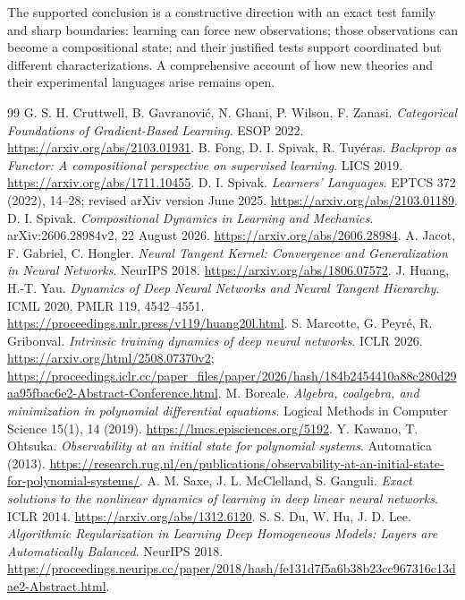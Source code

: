 \documentclass[11pt]{article}
\theoremstyle{definition}\newtheorem{definition}[theorem]{Definition}
\theoremstyle{remark}\newtheorem{remark}[theorem]{Remark}
\begin{document}
The supported conclusion is a constructive direction with an exact test
family and sharp boundaries: learning can force new observations; those
observations can become a compositional state; and their justified tests
support coordinated but different characterizations. A comprehensive account
of how new theories and their experimental languages arise remains open.

\begin{thebibliography}{99}
 G. S. H. Cruttwell, B. Gavranovi\'c, N. Ghani, P. Wilson, F. Zanasi. \emph{Categorical Foundations of Gradient-Based Learning}. ESOP 2022. \url{https://arxiv.org/abs/2103.01931}.
 B. Fong, D. I. Spivak, R. Tuy\'eras. \emph{Backprop as Functor: A compositional perspective on supervised learning}. LICS 2019. \url{https://arxiv.org/abs/1711.10455}.
 D. I. Spivak. \emph{Learners' Languages}. EPTCS 372 (2022), 14--28; revised arXiv version June 2025. \url{https://arxiv.org/abs/2103.01189}.
 D. I. Spivak. \emph{Compositional Dynamics in Learning and Mechanics}. arXiv:2606.28984v2, 22 August 2026. \url{https://arxiv.org/abs/2606.28984}.
 A. Jacot, F. Gabriel, C. Hongler. \emph{Neural Tangent Kernel: Convergence and Generalization in Neural Networks}. NeurIPS 2018. \url{https://arxiv.org/abs/1806.07572}.
 J. Huang, H.-T. Yau. \emph{Dynamics of Deep Neural Networks and Neural Tangent Hierarchy}. ICML 2020, PMLR 119, 4542--4551. \url{https://proceedings.mlr.press/v119/huang20l.html}.
 S. Marcotte, G. Peyr\'e, R. Gribonval. \emph{Intrinsic training dynamics of deep neural networks}. ICLR 2026. \url{https://arxiv.org/html/2508.07370v2}; \url{https://proceedings.iclr.cc/paper_files/paper/2026/hash/184b2454410a88c280d29aa95fbac6e2-Abstract-Conference.html}.
 M. Boreale. \emph{Algebra, coalgebra, and minimization in polynomial differential equations}. Logical Methods in Computer Science 15(1), 14 (2019). \url{https://lmcs.episciences.org/5192}.
 Y. Kawano, T. Ohtsuka. \emph{Observability at an initial state for polynomial systems}. Automatica (2013). \url{https://research.rug.nl/en/publications/observability-at-an-initial-state-for-polynomial-systems/}.
 A. M. Saxe, J. L. McClelland, S. Ganguli. \emph{Exact solutions to the nonlinear dynamics of learning in deep linear neural networks}. ICLR 2014. \url{https://arxiv.org/abs/1312.6120}.
 S. S. Du, W. Hu, J. D. Lee. \emph{Algorithmic Regularization in Learning Deep Homogeneous Models: Layers are Automatically Balanced}. NeurIPS 2018. \url{https://proceedings.neurips.cc/paper/2018/hash/fe131d7f5a6b38b23cc967316c13dae2-Abstract.html}.

\end{thebibliography}
\end{document}
